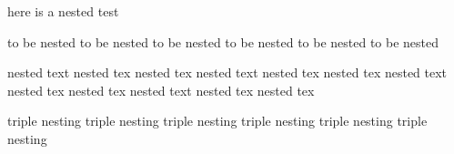 here is a nested test
\begin{one}
	to be nested to be nested
	to be nested to be nested
	to be nested to be nested
	\begin{two}
		nested text nested tex nested tex
		nested text nested tex nested tex
		nested text nested tex nested tex
		nested text nested tex nested tex
		\begin{three}
			triple nesting
			triple nesting
			triple nesting
			triple nesting
			triple nesting
			triple nesting
		\end{three}
	\end{two}
\end{one}
